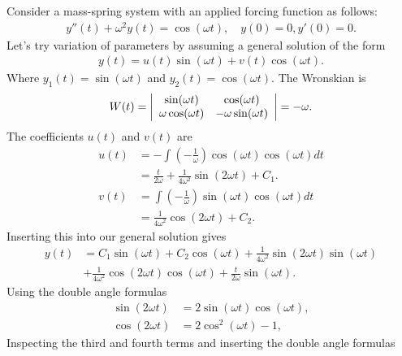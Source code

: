 Consider a mass-spring system with an applied forcing function as follows:
\begin{align}
  y''(t) + \omega^2 y(t) = \cos( \omega t ) , \quad y(0) = 0, y'(0) = 0.
\end{align}
Let's try variation of parameters by assuming a general solution of the form
\begin{align}
  y(t) = u(t) \sin( \omega t ) + v(t) \cos( \omega t ) .
\end{align}
Where $y_1(t) = \sin( \omega t )$ and $y_2(t) = \cos( \omega t )$. The Wronskian is
\begin{align}
  W(t) = \left| \begin{array}{c c} \sin( \omega t ) & \cos( \omega t ) \\ \omega \cos( \omega t ) & -\omega \sin( \omega t ) \\ \end{array} \right| = -\omega .
\end{align}
The coefficients $u(t)$ and $v(t)$ are
\begin{subequations}
\begin{align}
  u(t) &= -\int \left( -\frac{1}{\omega} \right) \cos(\omega t) \cos(\omega t) dt \nonumber \\
       &= \frac{t}{2\omega} + \frac{1}{4\omega^2} \sin(2 \omega t) + C_1. \\
  v(t) &=  \int \left( -\frac{1}{\omega} \right) \sin(\omega t) \cos( \omega t) dt \nonumber \\
       &= \frac{1}{4\omega^2} \cos( 2 \omega t ) + C_2 .
\end{align}
\end{subequations}
Inserting this into our general solution gives
\begin{align} 
  y(t) &= C_1 \sin(\omega t) + C_2 \cos(\omega t) + \frac{1}{4\omega^2} \sin(2\omega t) \sin(\omega t) \nonumber \\ &+ \frac{1}{4\omega^2} \cos(2\omega t) \cos(\omega t) + \frac{t}{2\omega} \sin(\omega t) .
\end{align}
Using the double angle formulas
\begin{subequations}
\begin{align}
  \sin( 2 \omega t ) &= 2 \sin( \omega t ) \cos( \omega t ), \\
  \cos( 2 \omega t ) &= 2 \cos^2 ( \omega t ) - 1,
\end{align}
\end{subequations}
Inspecting the third and fourth terms and inserting the double angle formulas
